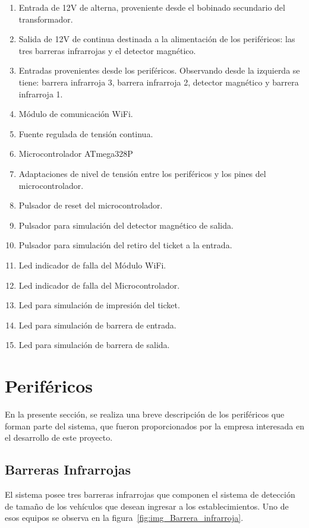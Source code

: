 \begin{enumerate}
	\item Entrada de 12V de alterna, proveniente desde el bobinado secundario del transformador.
	\item Salida de 12V de continua destinada a la alimentación de los periféricos: las tres barreras infrarrojas y el detector magnético.
	\item Entradas provenientes desde los periféricos. Observando desde la izquierda se tiene: barrera infrarroja 3, barrera infrarroja 2, detector magnético y barrera infrarroja 1.
	\item Módulo de comunicación WiFi.
	\item Fuente regulada de tensión continua.
	\item Microcontrolador ATmega328P
	\item Adaptaciones de nivel de tensión entre los periféricos y los pines del microcontrolador.
	\item Pulsador de reset del microcontrolador.
	\item Pulsador para simulación del detector magnético de salida.
	\item Pulsador para simulación del retiro del ticket a la entrada.
	\item Led indicador de falla del Módulo WiFi.
	\item Led indicador de falla del Microcontrolador.
	\item Led para simulación de impresión del ticket.
	\item Led para simulación de barrera de entrada.
	\item Led para simulación de barrera de salida.
\end{enumerate}




\section{Periféricos}
En la presente sección, se realiza una breve descripción de los periféricos que forman parte del sistema, que fueron proporcionados por la empresa interesada en el desarrollo de este proyecto.

\subsection{Barreras Infrarrojas}

El sistema posee tres barreras infrarrojas que componen el sistema de detección de tamaño de los vehículos que desean ingresar a los establecimientos. Uno de esos equipos se observa en la figura~\ref{fig:img_Barrera_infrarroja}.


